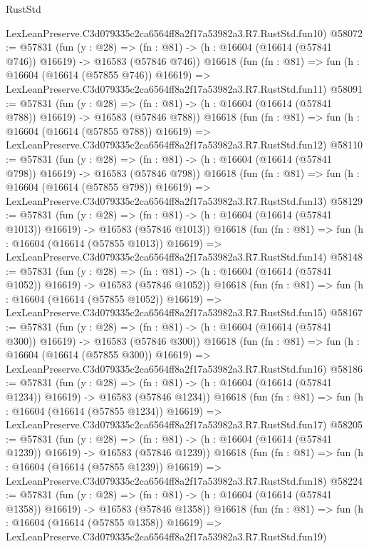 \begin{lexlean}{RustStd}
\begin{coremodule}
    LexLeanPreserve.C3d079335c2ca6564ff8a2f17a53982a3.R7.RustStd.fun10)
@58072 := @57831
    (fun (y : @28) =>
    (fn : @81) -> (h : @16604 (@16614 (@57841 @746)) @16619) -> @16583 (@57846 @746))
    @16618
    (fun (fn : @81) =>
    fun (h : @16604 (@16614 (@57855 @746)) @16619) =>
    LexLeanPreserve.C3d079335c2ca6564ff8a2f17a53982a3.R7.RustStd.fun11)
@58091 := @57831
    (fun (y : @28) =>
    (fn : @81) -> (h : @16604 (@16614 (@57841 @788)) @16619) -> @16583 (@57846 @788))
    @16618
    (fun (fn : @81) =>
    fun (h : @16604 (@16614 (@57855 @788)) @16619) =>
    LexLeanPreserve.C3d079335c2ca6564ff8a2f17a53982a3.R7.RustStd.fun12)
@58110 := @57831
    (fun (y : @28) =>
    (fn : @81) -> (h : @16604 (@16614 (@57841 @798)) @16619) -> @16583 (@57846 @798))
    @16618
    (fun (fn : @81) =>
    fun (h : @16604 (@16614 (@57855 @798)) @16619) =>
    LexLeanPreserve.C3d079335c2ca6564ff8a2f17a53982a3.R7.RustStd.fun13)
@58129 := @57831
    (fun (y : @28) =>
    (fn : @81) -> (h : @16604 (@16614 (@57841 @1013)) @16619) -> @16583 (@57846 @1013))
    @16618
    (fun (fn : @81) =>
    fun (h : @16604 (@16614 (@57855 @1013)) @16619) =>
    LexLeanPreserve.C3d079335c2ca6564ff8a2f17a53982a3.R7.RustStd.fun14)
@58148 := @57831
    (fun (y : @28) =>
    (fn : @81) -> (h : @16604 (@16614 (@57841 @1052)) @16619) -> @16583 (@57846 @1052))
    @16618
    (fun (fn : @81) =>
    fun (h : @16604 (@16614 (@57855 @1052)) @16619) =>
    LexLeanPreserve.C3d079335c2ca6564ff8a2f17a53982a3.R7.RustStd.fun15)
@58167 := @57831
    (fun (y : @28) =>
    (fn : @81) -> (h : @16604 (@16614 (@57841 @300)) @16619) -> @16583 (@57846 @300))
    @16618
    (fun (fn : @81) =>
    fun (h : @16604 (@16614 (@57855 @300)) @16619) =>
    LexLeanPreserve.C3d079335c2ca6564ff8a2f17a53982a3.R7.RustStd.fun16)
@58186 := @57831
    (fun (y : @28) =>
    (fn : @81) -> (h : @16604 (@16614 (@57841 @1234)) @16619) -> @16583 (@57846 @1234))
    @16618
    (fun (fn : @81) =>
    fun (h : @16604 (@16614 (@57855 @1234)) @16619) =>
    LexLeanPreserve.C3d079335c2ca6564ff8a2f17a53982a3.R7.RustStd.fun17)
@58205 := @57831
    (fun (y : @28) =>
    (fn : @81) -> (h : @16604 (@16614 (@57841 @1239)) @16619) -> @16583 (@57846 @1239))
    @16618
    (fun (fn : @81) =>
    fun (h : @16604 (@16614 (@57855 @1239)) @16619) =>
    LexLeanPreserve.C3d079335c2ca6564ff8a2f17a53982a3.R7.RustStd.fun18)
@58224 := @57831
    (fun (y : @28) =>
    (fn : @81) -> (h : @16604 (@16614 (@57841 @1358)) @16619) -> @16583 (@57846 @1358))
    @16618
    (fun (fn : @81) =>
    fun (h : @16604 (@16614 (@57855 @1358)) @16619) =>
    LexLeanPreserve.C3d079335c2ca6564ff8a2f17a53982a3.R7.RustStd.fun19)

\end{coremodule}
\end{lexlean}
